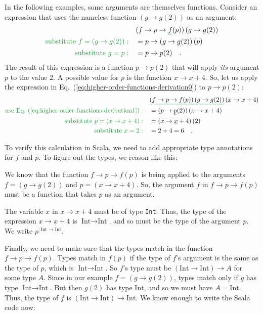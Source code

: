 In the following examples, some arguments are themselves functions.
Consider an expression that uses the nameless function $\left(g\rightarrow g(2)\right)$
as an argument:
\begin{align}
 & (f\rightarrow p\rightarrow\gunderline f(p))\left(g\rightarrow g(2)\right)\label{eq:higher-order-functions-derivation0}\\
{\color{greenunder}\text{substitute }f=\left(g\rightarrow g(2)\right):}\quad & =p\rightarrow(g\rightarrow\gunderline g(2))\,(p)\nonumber \\
{\color{greenunder}\text{substitute }g=p:}\quad & =p\rightarrow p(2)\quad.\label{eq:higher-order-functions-derivation1}
\end{align}
The result of this expression is a function $p\rightarrow p(2)$ that
will apply \emph{its} argument $p$ to the value $2$. A possible
value for $p$ is the function $x\rightarrow x+4$. So, let us apply
the expression in Eq.~(\ref{eq:higher-order-functions-derivation0})
to $p\rightarrow p(2)$:
\begin{align*}
 & \gunderline{\left(f\rightarrow p\rightarrow f(p)\right)\left(g\rightarrow g(2)\right)}\left(x\rightarrow x+4\right)\\
{\color{greenunder}\text{use Eq.~(\ref{eq:higher-order-functions-derivation1})}:}\quad & =(p\rightarrow\gunderline p(2))\left(x\rightarrow x+4\right)\\
{\color{greenunder}\text{substitute }p=\left(x\rightarrow x+4\right):}\quad & =(x\rightarrow\gunderline x+4)\left(2\right)\\
{\color{greenunder}\text{substitute }x=2:}\quad & =2+4=6\quad.
\end{align*}

To verify this calculation in Scala, we need to add appropriate type
annotations for $f$ and $p$. To figure out the types, we reason
like this:

We know that the function $f\rightarrow p\rightarrow f(p)$ is being
applied to the arguments $f=\left(g\rightarrow g(2)\right)$ and $p=\left(x\rightarrow x+4\right)$.
So, the argument $f$ in $f\rightarrow p\rightarrow f(p)$ must be
a function that takes $p$ as an argument.

The variable $x$ in $x\rightarrow x+4$ must be of type \lstinline!Int!.
Thus, the type of the expression $x\rightarrow x+4$ is $\text{Int}\rightarrow\text{Int}$,
and so must be the type of the argument $p$. We write $p^{:\text{Int}\rightarrow\text{Int}}$.

Finally, we need to make sure that the types match in the function
$f\rightarrow p\rightarrow f(p)$. Types match in $f(p)$ if the type
of $f$\textsf{'}s argument is the same as the type of $p$, which is $\text{Int}\rightarrow\text{Int}$.
So $f$\textsf{'}s type must be $\left(\text{Int}\rightarrow\text{Int}\right)\rightarrow A$
for some type $A$. Since in our example $f=\left(g\rightarrow g(2)\right)$,
types match only if $g$ has type $\text{Int}\rightarrow\text{Int}$.
But then $g(2)$ has type $\text{Int}$, and so we must have $A=\text{Int}$.
Thus, the type of $f$ is $\left(\text{Int}\rightarrow\text{Int}\right)\rightarrow\text{Int}$.
We know enough to write the Scala code now:

